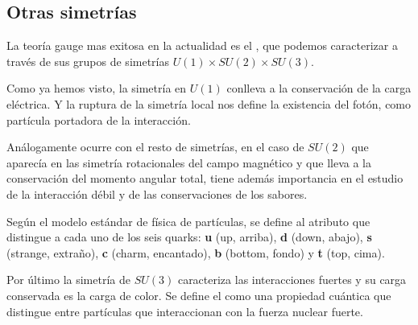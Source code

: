 \subsection{Otras simetrías}\label{sec:otras-simetrias}

La teoría gauge mas exitosa en la actualidad es el , que podemos caracterizar a través de sus grupos de simetrías $U(1)\times SU(2)\times SU(3)$.

Como ya hemos visto, la simetría en $U(1)$ conlleva a la conservación de la carga eléctrica. Y la ruptura de la simetría local nos define la existencia del fotón, como partícula portadora de la interacción.

Análogamente ocurre con el resto de simetrías, en el caso de $SU(2)$ que aparecía en las simetría rotacionales del campo magnético y que lleva a la conservación del momento angular total, tiene además importancia en el estudio de la interacción débil y de las conservaciones de los sabores\autocite[107]{ISMPP}.

Según el modelo estándar de física de partículas, se define  al atributo que distingue a cada uno de los seis quarks: \textbf{u} (up, arriba), \textbf{d} (down, abajo), \textbf{s} (strange, extraño), \textbf{c} (charm, encantado), \textbf{b} (bottom, fondo) y \textbf{t} (top, cima).


Por último la simetría de $SU(3)$ caracteriza las interacciones fuertes y su carga conservada es la carga de color. Se define el  como una propiedad cuántica que distingue entre partículas que interaccionan con la fuerza nuclear fuerte.


